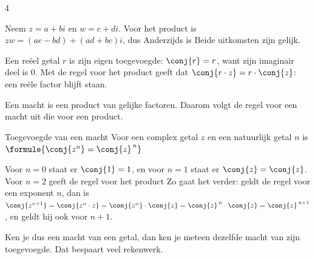 \begin{alleenvoor}{4}
\begin{theorie}
\begin{bewijs}
Neem $z = a + bi$ en $w = c + di$. Voor het product is $zw = (ac - bd) + (ad + bc)i$, dus
Anderzijds is
Beide uitkomsten zijn gelijk.
\end{bewijs}
\end{theorie}

Een reëel getal $r$ is zijn eigen toegevoegde: $\conj{r} = r$, want zijn imaginair deel is 0. Met de regel voor het product geeft dat $\conj{r \cdot z} = r \cdot \conj{z}$: een reële factor blijft staan.


Een macht is een product van gelijke factoren. Daarom volgt de regel voor een macht uit die voor een product.

\begin{theorie}
\begin{stelling}{Toegevoegde van een macht}
Voor een complex getal $z$ en een natuurlijk getal $n$ is \quad $\formule{\conj{z^n} = \conj{z}^{\,n}}$
\end{stelling}

\begin{bewijs}
Voor $n = 0$ staat er $\conj{1} = 1$, en voor $n = 1$ staat er $\conj{z} = \conj{z}$. Voor $n = 2$ geeft de regel voor het product
Zo gaat het verder: geldt de regel voor een exponent $n$, dan is $\conj{z^{n+1}} = \conj{z^n \cdot z} = \conj{z^n} \cdot \conj{z} = \conj{z}^{\,n} \cdot \conj{z} = \conj{z}^{\,n+1}$, en geldt hij ook voor $n + 1$.
\end{bewijs}
\end{theorie}

Ken je dus een macht van een getal, dan ken je meteen dezelfde macht van zijn toegevoegde. Dat bespaart veel rekenwerk.


\end{alleenvoor}

